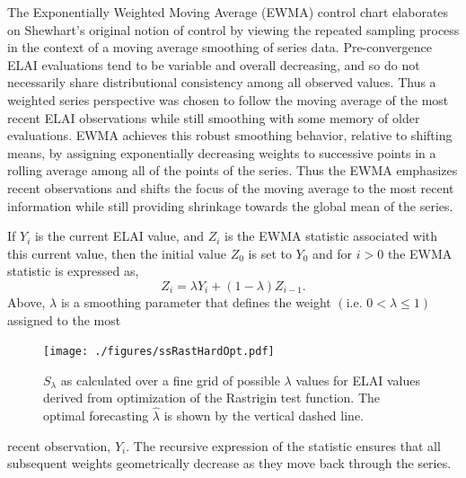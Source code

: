 \documentclass[12pt]{article}
\begin{document}
%
The Exponentially Weighted Moving Average (EWMA) control chart \citep{ewmaPaper, qccPack} elaborates on Shewhart's original notion of control by viewing the repeated sampling process in the context of a moving average smoothing of series data. %
Pre-convergence ELAI evaluations tend to be variable and overall decreasing, and so do not necessarily share distributional consistency among all observed values.  
%
Thus a weighted series perspective was chosen to follow the moving average of the most recent ELAI observations while still smoothing with some memory of older evaluations.
%
EWMA achieves this robust smoothing behavior, relative to shifting means, by assigning exponentially decreasing weights to successive points in a rolling average among all of the points of the series. Thus the EWMA emphasizes recent observations and shifts the focus of the moving average to the most recent information while still providing shrinkage towards the global mean of the series.

%
%

%
If $Y_i$ is the current ELAI value, and $Z_i$ is the EWMA statistic associated with this current value, then the initial value $Z_0$ is set to $Y_0$ and for $i>0$ the EWMA statistic is expressed as,
%
\begin{equation}
Z_i=\lambda Y_i+(1-\lambda)Z_{i-1}.
\label{ewmaStat}
\end{equation}
%
Above, $\lambda$ is a smoothing parameter that defines the weight $\left( \text{i.e. }0<\lambda\le1\right)$ assigned to the most 
%
%
\begin{figure}
\vspace{-0.8cm}
\texttt{[image: ./figures/ssRastHardOpt.pdf]}
\caption{ $S_\lambda$ as calculated over a fine grid of possible $\lambda$ values for ELAI values derived from optimization of the Rastrigin test function. The optimal forecasting $\hat\lambda$ is shown by the vertical dashed line. }
\label{bestL}
\end{figure}
%
%
recent observation, $Y_i$.
The recursive expression of the statistic ensures that all subsequent weights geometrically decrease as they move back through the series.
\end{document}
